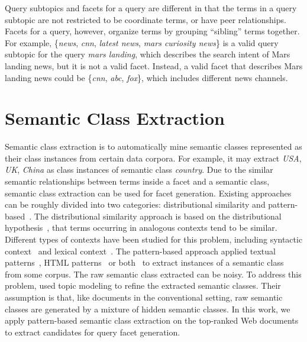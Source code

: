 Query subtopics and facets for a query are different in that the terms in a query subtopic are not restricted to be coordinate terms, or have peer relationships. Facets for a query, however, organize terms by grouping ``sibling'' terms together. For example, \{\textit{news}, \textit{cnn}, \textit{latest news}, \textit{mars curiosity news}\} is a valid query subtopic for the query \textit{mars landing}, which describes the search intent of Mars landing news, but it is not a valid facet. Instead, a valid facet that describes Mars landing news could be \{\textit{cnn}, \textit{abc}, \textit{fox}\}, which includes different news channels.

\section{Semantic Class Extraction}
Semantic class extraction is to automatically mine semantic classes represented as their class instances from certain data corpora. For example, it may extract \textit{USA}, \textit{UK}, \textit{China} as class instances of semantic class \textit{country}. Due to the similar semantic relationships between terms inside a facet and a semantic class, semantic class extraction can be used for facet generation. Existing approaches can be roughly divided into two categories: distributional similarity and pattern-based~\cite{shi2010corpus}. The distributional similarity approach is based on the distributional hypothesis~\cite{Harris}, that terms occurring in analogous contexts tend to be similar. Different types of contexts have been studied for this problem, including syntactic context~\cite{pantel2002discovering} and lexical context~\cite{pantel2004towards,agirre2009study,pantel2009web}.
The pattern-based approach applied textual patterns~\cite{hearst1992automatic,pasca2004acquisition}, HTML patterns~\cite{shinzato2007simple} or both~\cite{zhang2009employing,shi2010corpus} to extract instances of a semantic class from some corpus.
The raw semantic class extracted can be noisy. To address this problem, \citet{zhang2009employing} used topic modeling to refine the extracted semantic classes.
Their assumption is that, like documents in the conventional setting, raw semantic classes are generated by a mixture of hidden semantic classes.
In this work, we apply pattern-based semantic class extraction on the top-ranked Web documents to extract candidates for query facet generation.

